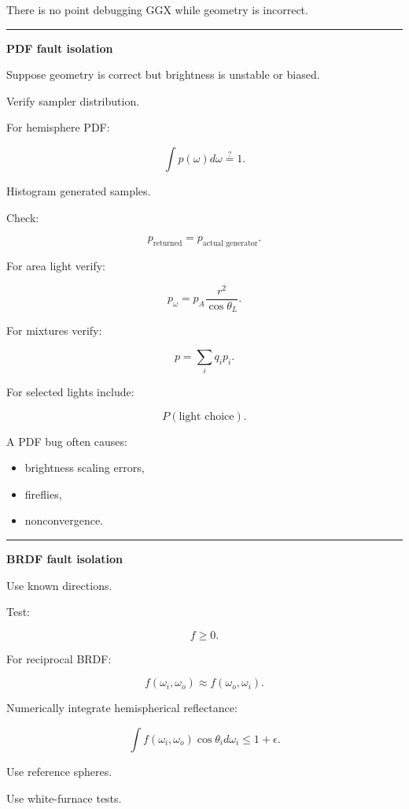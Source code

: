 There is no point debugging GGX while geometry is incorrect.

\begin{center}\rule{0.5\linewidth}{0.5pt}\end{center}

\textbf{PDF fault isolation}

Suppose geometry is correct but brightness is unstable or biased.

Verify sampler distribution.

For hemisphere PDF:

\[
\int p(\omega)d\omega
\stackrel{?}{=}1.
\]

Histogram generated samples.

Check:

\[
p_{\text{returned}}
=
p_{\text{actual generator}}.
\]

For area light verify:

\[
p_\omega=
p_A\frac{r^2}{\cos\theta_L}.
\]

For mixtures verify:

\[
p=
\sum_i q_i p_i.
\]

For selected lights include:

\[
P(\text{light choice}).
\]

A PDF bug often causes:

\begin{itemize}
\tightlist
\item
  brightness scaling errors,
\item
  fireflies,
\item
  nonconvergence.
\end{itemize}

\begin{center}\rule{0.5\linewidth}{0.5pt}\end{center}

\textbf{BRDF fault isolation}

Use known directions.

Test:

\[
f\ge0.
\]

For reciprocal BRDF:

\[
f(\omega_i,\omega_o)
\approx
f(\omega_o,\omega_i).
\]

Numerically integrate hemispherical reflectance:

\[
\int
f(\omega_i,\omega_o)
\cos\theta_i
d\omega_i
\le1+\epsilon.
\]

Use reference spheres.

Use white-furnace tests.

